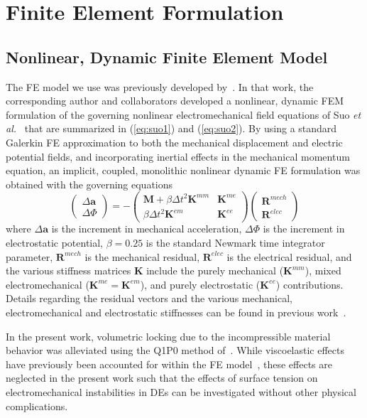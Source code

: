\documentclass[8.5pt,twoside,twocolumn]{article}
\newcommand{\mbf}{\mathbf}
\begin{document}
\section{Finite Element Formulation}
\subsection{Nonlinear, Dynamic Finite Element Model}

The FE model we use was previously developed by~\citet{parkIJSS2012}.  In that work, the corresponding author and collaborators developed a nonlinear, dynamic FEM formulation of the governing nonlinear electromechanical field equations of Suo \emph{et al.}~\cite{suoJMPS2008} that are summarized in (\ref{eq:suo1}) and (\ref{eq:suo2}).  By using a standard Galerkin FE approximation to both the mechanical displacement and electric potential fields, and incorporating inertial effects in the mechanical momentum equation, an implicit, coupled, monolithic nonlinear dynamic FE formulation was obtained with the governing equations~\citep{parkIJSS2012}
\begin{equation}\label{eq:fe1} \left(\begin{array}{cc}{\Delta\mbf{a}} \\ {\Delta\Phi}\end{array}\right)=-\left(\begin{array}{cc} {\mbf{M}+\beta\Delta t^{2}\mbf{K}^{mm}} & {\mbf{K}^{me}} \\ {\beta\Delta t^{2}\mbf{K}^{em}} & {\mbf{K}^{ee}} \end{array}\right)\left(\begin{array}{cc}{\mbf{R}^{mech}} \\ {\mbf{R}^{elec}}\end{array}\right)
\end{equation}
where $\Delta\mbf{a}$ is the increment in mechanical acceleration, $\Delta\Phi$ is the increment in electrostatic potential, $\beta=0.25$ is the standard Newmark time integrator parameter, $\mbf{R}^{mech}$ is the mechanical residual, $\mbf{R}^{elec}$ is the electrical residual, and the various stiffness matrices $\mbf{K}$ include the purely mechanical ($\mbf{K}^{mm}$), mixed electromechanical ($\mbf{K}^{me}=\mbf{K}^{em}$), and purely electrostatic ($\mbf{K}^{ee}$) contributions.  Details regarding the residual vectors and the various mechanical, electromechanical and electrostatic stiffnesses can be found in previous work~\citep{parkIJSS2012}.  

In the present work, volumetric locking due to the incompressible material behavior was alleviated using the Q1P0 method of~\citet{simoCMAME1985}.  While viscoelastic effects have previously been accounted for within the FE model~\citep{parkSM2013}, these effects are neglected in the present work such that the effects of surface tension on electromechanical instabilities in DEs can be investigated without other physical complications.
\end{document}
